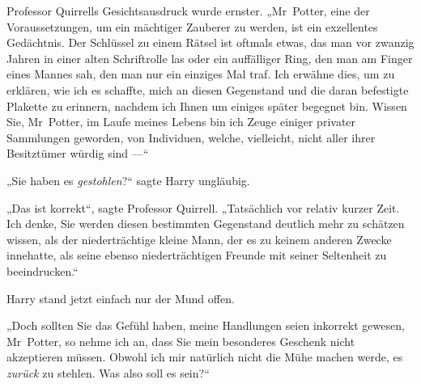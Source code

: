 Professor Quirrells Gesichtsausdruck wurde ernster.
„Mr~Potter, eine der Voraussetzungen, um ein mächtiger Zauberer zu werden, ist ein exzellentes Gedächtnis. Der Schlüssel zu einem Rätsel ist oftmals etwas, das man vor zwanzig Jahren in einer alten Schriftrolle las oder ein auffälliger Ring, den man am Finger eines Mannes sah, den man nur ein einziges Mal traf. Ich erwähne dies, um zu erklären, wie ich es schaffte, mich an diesen Gegenstand und die daran befestigte Plakette zu erinnern, nachdem ich Ihnen um einiges später begegnet bin. Wissen Sie, Mr~Potter, im Laufe meines Lebens bin ich Zeuge einiger privater Sammlungen geworden, von Individuen, welche, vielleicht, nicht aller ihrer Besitztümer würdig sind —“

„Sie haben es \emph{gestohlen}?“ sagte Harry ungläubig.

„Das ist korrekt“, sagte Professor Quirrell.
„Tatsächlich vor relativ kurzer Zeit. Ich denke, Sie werden diesen bestimmten Gegenstand deutlich mehr zu schätzen wissen, als der niederträchtige kleine Mann, der es zu keinem anderen Zwecke innehatte, als seine ebenso niederträchtigen Freunde mit seiner Seltenheit zu beeindrucken.“

Harry stand jetzt einfach nur der Mund offen.

„Doch sollten Sie das Gefühl haben, meine Handlungen seien inkorrekt gewesen, Mr~Potter, so nehme ich an, dass Sie mein besonderes Geschenk nicht akzeptieren müssen. Obwohl ich mir natürlich nicht die Mühe machen werde, es \emph{zurück} zu stehlen. Was also soll es sein?“

